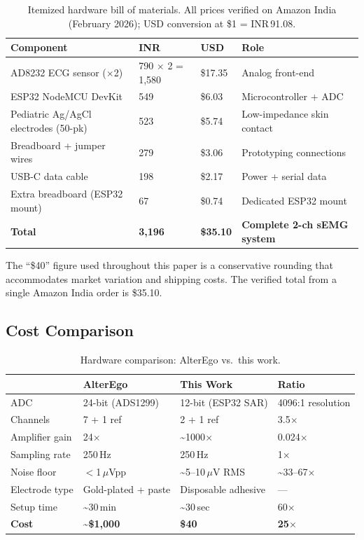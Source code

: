 \documentclass{article}
\begin{document}
\begin{table}[h]
\centering
\caption{Itemized hardware bill of materials. All prices verified on Amazon India (February 2026); USD conversion at \$1 = INR\,91.08.}
\label{tab:bom}
\begin{tabular}{@{}llll@{}}
\toprule
Component & INR & USD & Role \\
\midrule
AD8232 ECG sensor ($\times$2) & 790 $\times$ 2 = 1{,}580 & \$17.35 & Analog front-end \\
ESP32 NodeMCU DevKit & 549 & \$6.03 & Microcontroller + ADC \\
Pediatric Ag/AgCl electrodes (50-pk) & 523 & \$5.74 & Low-impedance skin contact \\
Breadboard + jumper wires & 279 & \$3.06 & Prototyping connections \\
USB-C data cable & 198 & \$2.17 & Power + serial data \\
Extra breadboard (ESP32 mount) & 67 & \$0.74 & Dedicated ESP32 mount \\
\midrule
\textbf{Total} & \textbf{3{,}196} & \textbf{\$35.10} & \textbf{Complete 2-ch sEMG system} \\
\bottomrule
\end{tabular}
\end{table}

\noindent The ``\$40'' figure used throughout this paper is a conservative rounding that accommodates market variation and shipping costs. The verified total from a single Amazon India order is \$35.10.

\subsection{Cost Comparison}

\begin{table}[h]
\centering
\caption{Hardware comparison: AlterEgo vs.\ this work.}
\label{tab:cost}
\begin{tabular}{@{}llll@{}}
\toprule
& AlterEgo~\cite{kapur2018} & This Work & Ratio \\
\midrule
ADC            & 24-bit (ADS1299)       & 12-bit (ESP32 SAR) & 4096:1 resolution \\
Channels       & 7 + 1 ref              & 2 + 1 ref          & 3.5$\times$ \\
Amplifier gain & 24$\times$             & \textasciitilde1000$\times$ & 0.024$\times$ \\
Sampling rate  & 250\,Hz                & 250\,Hz            & 1$\times$ \\
Noise floor    & $<$1\,$\mu$Vpp         & \textasciitilde5--10\,$\mu$V RMS & \textasciitilde33--67$\times$ \\
Electrode type & Gold-plated + paste    & Disposable adhesive & --- \\
Setup time     & \textasciitilde30\,min & \textasciitilde30\,sec & 60$\times$ \\
\textbf{Cost}  & \textbf{\textasciitilde\$1{,}000} & \textbf{\$40} & \textbf{25$\times$} \\
\bottomrule
\end{tabular}
\end{table}
\end{document}
